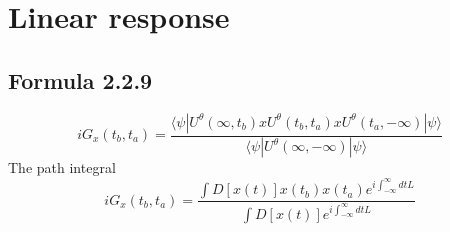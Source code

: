 \documentclass[a4paper,11pt]{article}
\begin{document}
\section{Linear response}
\subsection{Formula 2.2.9}
\begin{equation*}
  iG_{x}(t_b,t_a)=\frac{\langle\psi|U^{\theta}(\infty,t_b)xU^\theta(t_b,t_a)xU^\theta(t_a,-\infty)|\psi\rangle}{\langle\psi|U^\theta(\infty,-\infty)|\psi\rangle}
\end{equation*}
The path integral
\begin{equation*}
  iG_x(t_b,t_a)=\frac{\int D[x(t)] x(t_b)x(t_a)e^{i\int_{-\infty}^{\infty}dt L}}{\int D[x(t)]e^{i\int_{-\infty}^{\infty}dt L}}
\end{equation*}
\end{document}
